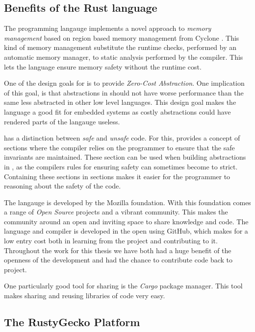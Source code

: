 \subsection{Benefits of the Rust language}
The {\rust} programming langauge implements a novel approach to \emph{memory management} based on region based memory management from Cyclone \cite{Grossman2002,Swamy2006}.
This kind of memory management substitute the runtime checks, performed by an automatic memory manager, to static analysis performed by the compiler.
This lets the {\rust} language ensure memory safety without the runtime cost.

One of the design goals for {\rust} is to provide \emph{Zero-Cost Abstraction}.
One implication of this goal, is that abstractions in {\rust} should not have worse performance than the same less abstracted in other low level languages.
This design goal makes the language a good fit for embedded systems as costly abstractions could have rendered parts of the langauge useless.

{\rust} has a distinction between \emph{safe} and \emph{unsafe} code.
For this, {\rust} provides a concept of {\unsafe} sections where the compiler relies on the programmer to ensure that the safe invariants are maintained.
These section can be used when building abstractions in {\rust}, as the compilers rules for ensuring safety can sometimes become to strict.
Containing these sections in {\unsafe} sections makes it easier for the programmer to reasoning about the safety of the code.

The {\rust} langauge is developed by the Mozilla foundation.
With this foundation comes a range of \emph{Open Source} projects and a vibrant community.
This makes the community around {\rust} an open and inviting space to share knowledge and code.
The {\rust} language and compiler is developed in the open using GitHub, which makes for a low entry cost both in learning from the project and contributing to it.
Throughout the work for this thesis we have both had a huge benefit of the openness of the development and had the chance to contribute code back to project.

One particularly good tool for sharing {\rust} is the \emph{Cargo} package manager.
This tool makes sharing and reusing libraries of code very easy.

\subsection{The RustyGecko Platform}

